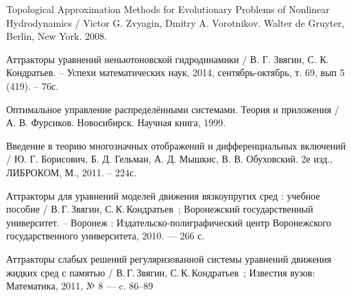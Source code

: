 \begin{thebibliography}{99}

 Topological Approximation Methods for Evolutionary Problems of Nonlinear Hydrodynamics / Victor G. Zvyagin, Dmitry A. Vorotnikov. Walter de Gruyter, Berlin, New York. 2008.

 Аттракторы уравнений неньютоновской гидродинамики / В. Г. Звягин, С. К. Кондратьев. – Успехи математических наук, 2014, сентябрь-октябрь, т. 69, вып 5 (419). – 76с.

 Оптимальное управление распределёнными системами. Теория и приложения / А. В. Фурсиков. Новосибирск. Научная книга, 1999.

 Введение в теорию многозначных отображений и дифференциальных включений / Ю. Г. Борисович, Б. Д. Гельман, А. Д. Мышкис, В. В. Обуховский.  2е изд., ЛИБРОКОМ, М., 2011. – 224с.

 Аттракторы для уравнений моделей движения вязкоупругих сред : учебное пособие / В.\,Г.\,Звягин, С.\,К.\,Кондратьев~; Воронежский государственный университет. -- Воронеж : Издательско-полиграфический центр Воронежского государственного университета, 2010. --- 266 с.

 Аттракторы слабых решений регуляризованной системы уравнений движения жидких сред с памятью / В.\,Г.\,Звягин, С.\,К.\,Кондратьев~; Известия вузов: Математика, 2011, № 8 --- c. 86–89

\end{thebibliography}
